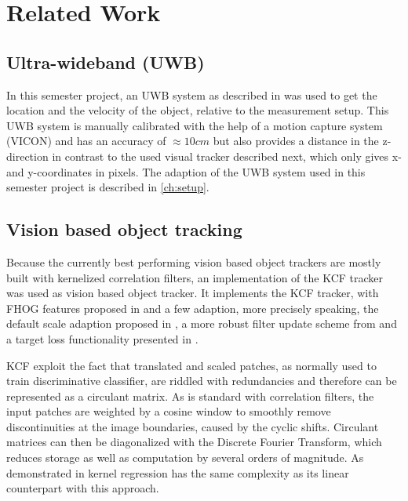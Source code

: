 
\setcounter{chapter}{1}

\chapter{Related Work}

\section{Ultra-wideband (UWB)}
In this semester project, an \ac{UWB} system as described in \cite{Naegeli:2016} was used to get the location and the velocity of the object, relative to the measurement setup. This \ac{UWB} system is manually calibrated with the help of a motion capture system (VICON) and has an accuracy of $\approx 10 cm$ but also provides a distance in the z-direction in contrast to the used visual tracker described next, which only gives x- and y-coordinates in pixels. The adaption of the \ac{UWB} system used in this semester project is described in \autoref{ch:setup}.

\section{Vision based object tracking}
Because the currently best performing vision based object trackers are mostly built with kernelized correlation filters, an implementation of the \ac{KCF} tracker \cite{henriques2015tracking} was used as vision based object tracker\cite{Haag:2015}. It implements the \ac{KCF} tracker, with FHOG features proposed in \cite{lsvm-pami} and a few adaption, more precisely speaking, the default scale adaption proposed in \cite{danelljan2014dsst}, a more robust filter update scheme from \cite{danelljan2014colorattributes} and a target loss functionality presented in \cite{bolme2010mosse}.

\ac{KCF} exploit the fact that translated and scaled patches, as normally used to train discriminative classifier, are riddled with redundancies and therefore can be represented as a circulant matrix. As is standard with correlation filters, the input patches are weighted by a cosine window to smoothly remove discontinuities at the image boundaries, caused by the cyclic shifts. Circulant matrices can then be diagonalized with the Discrete Fourier Transform, which reduces storage as well as computation by several orders of magnitude. As demonstrated in \cite{henriques2015tracking} kernel regression has the same complexity as its linear counterpart with this approach.

